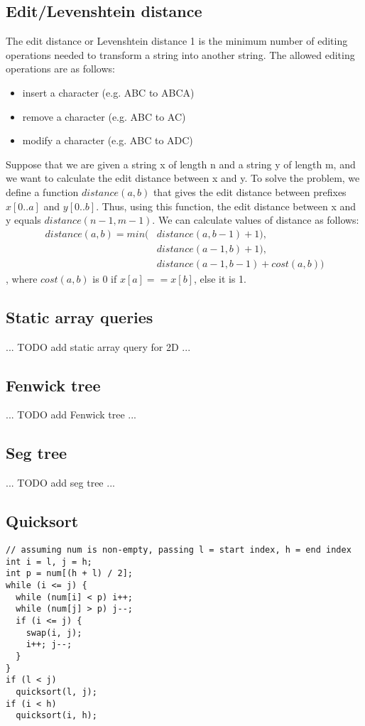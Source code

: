 \documentclass[a4paper]{article}
\begin{document}
\subsection{Edit/Levenshtein distance}
The edit distance or Levenshtein distance 1 is the minimum number of editing operations needed to transform a string into another string. The allowed editing operations are as follows:
\begin{itemize}
  \item insert a character (e.g. ABC to ABCA)
  \item remove a character (e.g. ABC to AC)
  \item modify a character (e.g. ABC to ADC)
\end{itemize}
Suppose that we are given a string x of length n and a string y of length m, and we want to calculate the edit distance between x and y. To solve the problem, we define a function $distance(a, b)$ that gives the edit distance between prefixes
$x[0..a]$ and $y[0..b]$. Thus, using this function, the edit distance between x and y equals $distance(n - 1, m - 1)$.
We can calculate values of distance as follows:
\begin{align}
  distance(a, b) = min(&distance(a, b - 1) + 1), \\
                       &distance(a - 1, b) + 1), \\
                       &distance(a - 1, b - 1) + cost(a, b))
\end{align}
, where $cost(a, b)$ is 0 if $x[a] == x[b]$, else it is 1.


\subsection{Static array queries}
... TODO add static array query for 2D ...


\subsection{Fenwick tree}
... TODO add Fenwick tree ...


\subsection{Seg tree}
... TODO add seg tree ...


\subsection{Quicksort}
\begin{lstlisting}
// assuming num is non-empty, passing l = start index, h = end index
int i = l, j = h;
int p = num[(h + l) / 2];
while (i <= j) {
  while (num[i] < p) i++;
  while (num[j] > p) j--;
  if (i <= j) {
    swap(i, j);
    i++; j--;
  }
}
if (l < j)
  quicksort(l, j);
if (i < h)
  quicksort(i, h);

\end{lstlisting}
\end{document}
